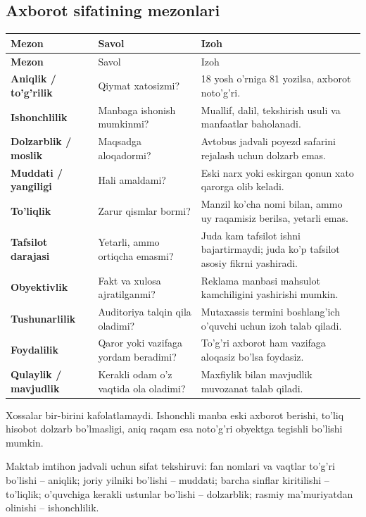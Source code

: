 \documentclass[11pt,a4paper,oneside]{book}
\begin{document}
\subsection{Axborot sifatining mezonlari}
\begin{longtable}{>{\bfseries\color{teal}}p{31mm}p{56mm}p{66mm}}
\toprule
Mezon & Savol & Izoh\\
\midrule
\endfirsthead
\toprule Mezon & Savol & Izoh\\\midrule\endhead
Aniqlik / to'g'rilik & Qiymat xatosizmi? & 18 yosh o'rniga 81 yozilsa, axborot noto'g'ri.\\
Ishonchlilik & Manbaga ishonish mumkinmi? & Muallif, dalil, tekshirish usuli va manfaatlar baholanadi.\\
Dolzarblik / moslik & Maqsadga aloqadormi? & Avtobus jadvali poyezd safarini rejalash uchun dolzarb emas.\\
Muddati / yangiligi & Hali amaldami? & Eski narx yoki eskirgan qonun xato qarorga olib keladi.\\
To'liqlik & Zarur qismlar bormi? & Manzil ko'cha nomi bilan, ammo uy raqamisiz berilsa, yetarli emas.\\
Tafsilot darajasi & Yetarli, ammo ortiqcha emasmi? & Juda kam tafsilot ishni bajartirmaydi; juda ko'p tafsilot asosiy fikrni yashiradi.\\
Obyektivlik & Fakt va xulosa ajratilganmi? & Reklama manbasi mahsulot kamchiligini yashirishi mumkin.\\
Tushunarlilik & Auditoriya talqin qila oladimi? & Mutaxassis termini boshlang'ich o'quvchi uchun izoh talab qiladi.\\
Foydalilik & Qaror yoki vazifaga yordam beradimi? & To'g'ri axborot ham vazifaga aloqasiz bo'lsa foydasiz.\\
Qulaylik / mavjudlik & Kerakli odam o'z vaqtida ola oladimi? & Maxfiylik bilan mavjudlik muvozanat talab qiladi.\\
\bottomrule
\end{longtable}

\begin{warningbox}
Xossalar bir-birini kafolatlamaydi. Ishonchli manba eski axborot berishi, to'liq hisobot dolzarb bo'lmasligi, aniq raqam esa noto'g'ri obyektga tegishli bo'lishi mumkin.
\end{warningbox}

\begin{examplebox}
Maktab imtihon jadvali uchun sifat tekshiruvi: fan nomlari va vaqtlar to'g'ri bo'lishi -- aniqlik; joriy yilniki bo'lishi -- muddati; barcha sinflar kiritilishi -- to'liqlik; o'quvchiga kerakli ustunlar bo'lishi -- dolzarblik; rasmiy ma'muriyatdan olinishi -- ishonchlilik.
\end{examplebox}
\end{document}
